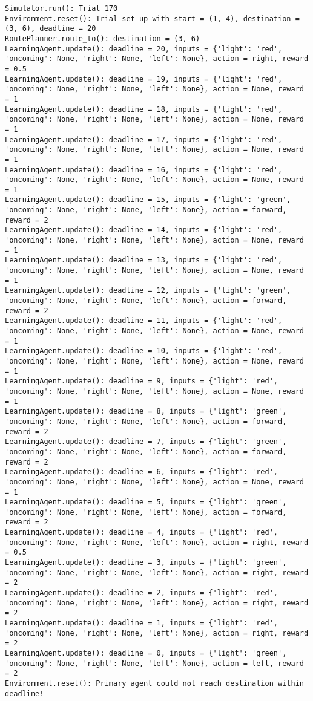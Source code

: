 \documentclass{article}
\begin{document}
\begin{verbatim}
Simulator.run(): Trial 170
Environment.reset(): Trial set up with start = (1, 4), destination = (3, 6), deadline = 20
RoutePlanner.route_to(): destination = (3, 6)
LearningAgent.update(): deadline = 20, inputs = {'light': 'red', 'oncoming': None, 'right': None, 'left': None}, action = right, reward = 0.5
LearningAgent.update(): deadline = 19, inputs = {'light': 'red', 'oncoming': None, 'right': None, 'left': None}, action = None, reward = 1
LearningAgent.update(): deadline = 18, inputs = {'light': 'red', 'oncoming': None, 'right': None, 'left': None}, action = None, reward = 1
LearningAgent.update(): deadline = 17, inputs = {'light': 'red', 'oncoming': None, 'right': None, 'left': None}, action = None, reward = 1
LearningAgent.update(): deadline = 16, inputs = {'light': 'red', 'oncoming': None, 'right': None, 'left': None}, action = None, reward = 1
LearningAgent.update(): deadline = 15, inputs = {'light': 'green', 'oncoming': None, 'right': None, 'left': None}, action = forward, reward = 2
LearningAgent.update(): deadline = 14, inputs = {'light': 'red', 'oncoming': None, 'right': None, 'left': None}, action = None, reward = 1
LearningAgent.update(): deadline = 13, inputs = {'light': 'red', 'oncoming': None, 'right': None, 'left': None}, action = None, reward = 1
LearningAgent.update(): deadline = 12, inputs = {'light': 'green', 'oncoming': None, 'right': None, 'left': None}, action = forward, reward = 2
LearningAgent.update(): deadline = 11, inputs = {'light': 'red', 'oncoming': None, 'right': None, 'left': None}, action = None, reward = 1
LearningAgent.update(): deadline = 10, inputs = {'light': 'red', 'oncoming': None, 'right': None, 'left': None}, action = None, reward = 1
LearningAgent.update(): deadline = 9, inputs = {'light': 'red', 'oncoming': None, 'right': None, 'left': None}, action = None, reward = 1
LearningAgent.update(): deadline = 8, inputs = {'light': 'green', 'oncoming': None, 'right': None, 'left': None}, action = forward, reward = 2
LearningAgent.update(): deadline = 7, inputs = {'light': 'green', 'oncoming': None, 'right': None, 'left': None}, action = forward, reward = 2
LearningAgent.update(): deadline = 6, inputs = {'light': 'red', 'oncoming': None, 'right': None, 'left': None}, action = None, reward = 1
LearningAgent.update(): deadline = 5, inputs = {'light': 'green', 'oncoming': None, 'right': None, 'left': None}, action = forward, reward = 2
LearningAgent.update(): deadline = 4, inputs = {'light': 'red', 'oncoming': None, 'right': None, 'left': None}, action = right, reward = 0.5
LearningAgent.update(): deadline = 3, inputs = {'light': 'green', 'oncoming': None, 'right': None, 'left': None}, action = right, reward = 2
LearningAgent.update(): deadline = 2, inputs = {'light': 'red', 'oncoming': None, 'right': None, 'left': None}, action = right, reward = 2
LearningAgent.update(): deadline = 1, inputs = {'light': 'red', 'oncoming': None, 'right': None, 'left': None}, action = right, reward = 2
LearningAgent.update(): deadline = 0, inputs = {'light': 'green', 'oncoming': None, 'right': None, 'left': None}, action = left, reward = 2
Environment.reset(): Primary agent could not reach destination within deadline!
\end{verbatim}





    
\end{document}
